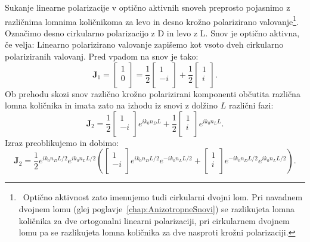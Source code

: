 Sukanje linearne polarizacije v optično aktivnih snoveh preprosto pojasnimo
z različnima lomnima količnikoma za levo in desno krožno polarizirano valovanje\footnote{~Optično 
aktivnost zato imenujemo tudi cirkularni dvojni lom. Pri navadnem dvojnem lomu
(glej poglavje~\ref{chap:AnizotropneSnovi}) se razlikujeta lomna količnika za dve 
ortogonalni linearni polarizaciji, pri cirkularnem dvojnem lomu pa se razlikujeta lomna
količnika za dve nasproti krožni polarizaciji.}.
Označimo desno cirkularno polarizacijo z D in levo z L. Snov je optično aktivna, če velja:
Linearno polarizirano valovanje zapišemo kot vsoto dveh cirkularno polariziranih
valovanj. Pred vpadom na snov je tako:
\begin{equation}
\mathbf{J}_{1} = 
\left[\begin{array}{c}
1\\
0\\
\end{array}\right] = 
\frac{1}{2}
\left[\begin{array}{c}
1\\
-i\\
\end{array}\right]
+ 
\frac{1}{2}
\left[\begin{array}{c}
1\\
i\\
\end{array}\right]\!\!.
\label{eq:09_43}
\end{equation}
Ob prehodu skozi snov različno krožno polarizirani komponenti 
občutita različna lomna količnika in imata zato na izhodu iz snovi z 
dolžino $L$ različni fazi:
\begin{equation}
\mathbf{J}_{2}  = 
\frac{1}{2}
\left[\begin{array}{c}
1\\
-i\\
\end{array}\right]e^{ik_0n_D L}
+ 
\frac{1}{2}
\left[\begin{array}{c}
1\\
i\\
\end{array}\right]e^{ik_0n_L L}.
\label{eq:09_44}
\end{equation}
Izraz preoblikujemo in dobimo:
\begin{equation}
\mathbf{J}_{2}  = \frac{1}{2} e^{ik_0n_D L/2}e^{ik_0n_L L/2}
\left(
\left[\begin{array}{c}
1\\
-i\\
\end{array}\right]e^{ik_0n_D L/2} e^{-ik_0n_L L/2}+
\left[\begin{array}{c}
1\\
i\\
\end{array}\right]e^{-ik_0n_D L/2} e^{ik_0n_L L/2}
\right)\!\!.
\label{eq:09_45}
\end{equation}

